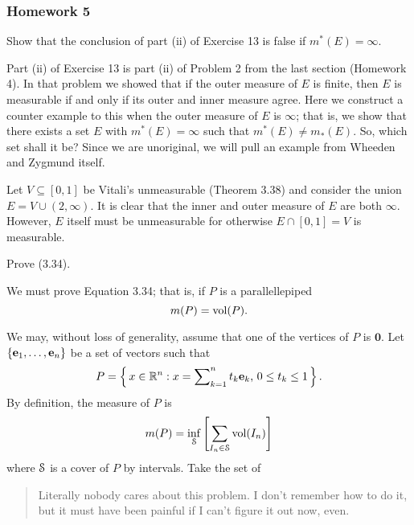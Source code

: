 \subsubsection{Homework 5}
\setcounter{exercise}{0}
\setcounter{equation}{0}

\begin{problem}
  Show that the conclusion of part (ii) of Exercise 13 is false if
  $m^*(E)=\infty$.
\end{problem}
\begin{solution}
  Part (ii) of Exercise 13 is part (ii) of Problem 2 from the last section
  (Homework 4). In that problem we showed that if the outer measure of $E$
  is finite, then $E$ is measurable if and only if its outer and inner
  measure agree. Here we construct a counter example to this when the outer
  measure of $E$ is $\infty$; that is, we show that there exists a set $E$
  with $m^*(E)=\infty$ such that $m^*(E)\neq m_*(E)$. So, which set shall
  it be? Since we are unoriginal, we will pull an example from Wheeden and
  Zygmund itself.

  Let $V\subseteq[0,1]$ be Vitali's unmeasurable (Theorem 3.38) and consider
  the union $E=V\cup(2,\infty)$. It is clear that the inner and outer
  measure of $E$ are both $\infty$. However, $E$ itself must be
  unmeasurable for otherwise $E\cap [0,1]=V$ is measurable.
\end{solution}

\begin{problem}
  Prove (3.34).
\end{problem}
\begin{solution}
  We must prove Equation 3.34; that is, if $P$ is a parallellepiped
  \[
    m(P)=\operatorname{vol}(P).
  \]

  We may, without loss of generality, assume that one of the vertices of
  $P$ is $\mathbf{0}$. Let $\{\mathbf{e}_1,\ldots,\mathbf{e}_n\}$ be a set of vectors
  such that
  \[
    P=\left\{\,x\in\mathbb{R}^n:
      \text{$x=\sum\nolimits_{k=1}^n t_k\mathbf{e}_k$, $0\leq t_k\leq 1$}\,\right\}.
  \]
  By definition, the measure of $P$ is
  \[
    m(P)=\inf_{\mathcal{S}}\left[\sum_{I_n\in\mathcal{S}}\operatorname{vol}(I_n)\right]
  \]
  where $\mathcal{S}$ is a cover of $P$ by intervals. Take the set of
  \begin{quote}
    \begin{remarks*}
      Literally nobody cares about this problem. I don't remember how to do
      it, but it must have been painful if I can't figure it out now, even.
    \end{remarks*}
  \end{quote}
\end{solution}

